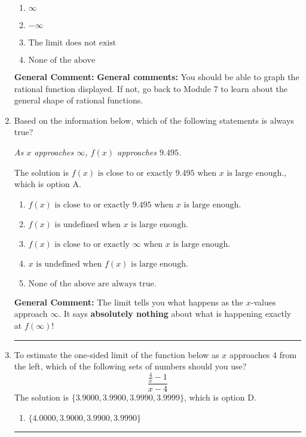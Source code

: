 \documentclass{extbook}[14pt]
\newcommand{\litem}[1]{\item #1

\rule{\textwidth}{0.4pt}}
\begin{document}
\begin{enumerate}
{\begin{enumerate}[label=\Alph*.]
\item \( \infty \)


\item \( -\infty \)


\item \( \text{The limit does not exist} \)


\item \( \text{None of the above} \)


\end{enumerate}

\textbf{General Comment:} \textbf{General comments:} You should be able to graph the rational function displayed. If not, go back to Module 7 to learn about the general shape of rational functions.
}
\litem{
Based on the information below, which of the following statements is always true?

\begin{center}
    \textit{ As $x$ approaches $\infty$, $f(x)$ approaches $9.495$. }
\end{center}
The solution is \( f(x) \text{ is close to or exactly } 9.495 \text{ when } x \text{ is large enough}. \), which is option A.\begin{enumerate}[label=\Alph*.]
\item \( f(x) \text{ is close to or exactly } 9.495 \text{ when } x \text{ is large enough}. \)


\item \( f(x) \text{ is undefined when } x \text{ is large enough}. \)


\item \( f(x) \text{ is close to or exactly } \infty \text{ when } x \text{ is large enough}. \)


\item \( x \text{ is undefined when } f(x) \text{ is large enough}. \)


\item \( \text{None of the above are always true.} \)


\end{enumerate}

\textbf{General Comment:} The limit tells you what happens as the $x$-values approach $\infty$. It says \textbf{absolutely nothing} about what is happening exactly at $f(\infty)$!
}
\litem{
To estimate the one-sided limit of the function below as $x$ approaches 4 from the left, which of the following sets of numbers should you use?
\[ \frac{\frac{4}{x} - 1}{x - 4} \]The solution is \( \{ 3.9000, 3.9900, 3.9990, 3.9999 \} \), which is option D.\begin{enumerate}[label=\Alph*.]
\item \( \{ 4.0000, 3.9000, 3.9900, 3.9990 \} \)


\end{enumerate}}
\end{enumerate}
\end{document}
